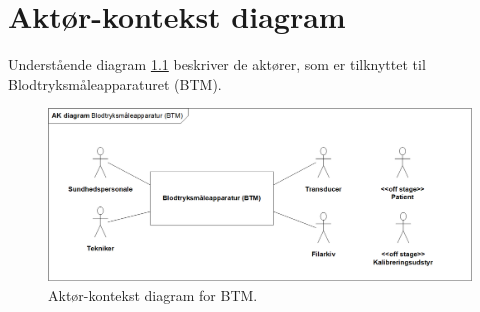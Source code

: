 \chapter{Aktør-kontekst diagram}
Understående diagram \ref{fig:Aktor} beskriver de aktører, som er tilknyttet til Blodtryksmåleapparaturet (BTM). 
\begin{figure}[H]
\includegraphics[scale=0.8]{Billeder/akdiagram.png}
\centering
\caption{Aktør-kontekst diagram for BTM.}
\label{fig:Aktor}
\end{figure}